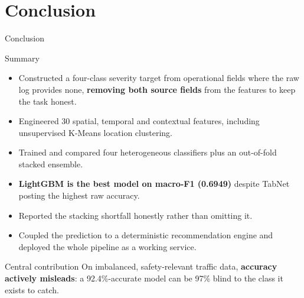 \section{Conclusion}

\begin{frame}{Conclusion}
  \begin{block}{Summary}
    \begin{itemize}
      \item Constructed a four-class severity target from operational fields
            where the raw log provides none, \textbf{removing both source fields}
            from the features to keep the task honest.
      \item Engineered 30 spatial, temporal and contextual features, including
            unsupervised K-Means location clustering.
      \item Trained and compared four heterogeneous classifiers plus an
            out-of-fold stacked ensemble.
      \item \textbf{LightGBM is the best model on macro-F1 (0.6949)} despite
            TabNet posting the highest raw accuracy.
      \item Reported the stacking shortfall honestly rather than omitting it.
      \item Coupled the prediction to a deterministic recommendation engine and
            deployed the whole pipeline as a working service.
    \end{itemize}
  \end{block}
  \begin{alertblock}{Central contribution}
    \centering On imbalanced, safety-relevant traffic data, \textbf{accuracy
    actively misleads}: a 92.4\%-accurate model can be 97\% blind to the class
    it exists to catch.
  \end{alertblock}
\end{frame}

